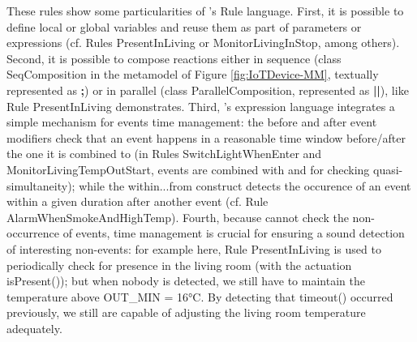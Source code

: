 These rules show some particularities of \IOTDSL's Rule language. First, it is possible to define local or global variables and reuse them as part of parameters or expressions (cf. Rules \textsf{PresentInLiving} or \textsf{MonitorLivingInStop}, among others). Second, it is possible to compose reactions either in sequence (class \textsf{SeqComposition} in the metamodel of Figure \ref{fig:IoTDevice-MM}, textually represented as \textsf{\textbf{;}}) or in parallel (class \textsf{ParallelComposition}, represented as \textsf{\textbf{||}}), like Rule \textsf{PresentInLiving} demonstrates. Third, \IOTDSL's expression language integrates a simple mechanism for events time management: the \textsf{before} and \textsf{after} event modifiers check that an event happens in a reasonable time window before/after the one it is combined to (in Rules \textsf{SwitchLightWhenEnter} and \textsf{MonitorLivingTempOutStart}, events are combined with \textsf{and} for checking quasi-simultaneity); while the \textsf{within...from} construct detects the occurence of an event within a given duration after another event (cf. Rule \textsf{AlarmWhenSmokeAndHighTemp}). Fourth, because \IOTDSL cannot check the non-occurrence of events, time management is crucial for ensuring a sound detection of interesting non-events: for example here, Rule \textsf{PresentInLiving} is used to periodically check for presence in the living room (with the actuation \textsf{isPresent()}); but when nobody is detected, we still have to maintain the temperature above \textsf{OUT\_MIN} = 16°C. By detecting that \textsf{timeout()} occurred previously, we still are capable of adjusting the living room temperature adequately.
